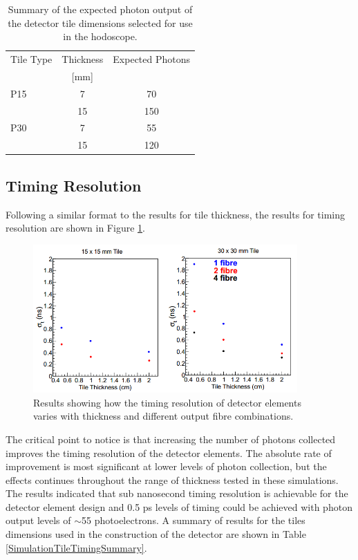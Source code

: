 \begin{table}\centering
	\renewcommand{\arraystretch}{1.3}
	\begin{tabular}{ @{}l  c  c@{}} 
		\toprule
		Tile Type & Thickness & Expected Photons \\
		& {\small [mm]}& \\
		\midrule
		P15 & 7 & 70 \\
		& 15 & 150 \\
		\midrule
		P30 & 7 & 55  \\
		& 15 & 120 \\
		\bottomrule
	\end{tabular}
	\caption{Summary of the expected photon output of the detector tile dimensions selected for use in the hodoscope.}
	\label{SimulationTileThickSummary}
\end{table}

\subsection{Timing Resolution}

Following a similar format to the results for tile thickness, the results for timing resolution are shown in Figure \ref{SimulationTiming}.

\begin{figure}
	\centering
	\includegraphics[width=0.9\textwidth]{ImgChap1/timingsim}
	\caption{Results showing how the timing resolution of detector elements varies with thickness and different output fibre combinations. \cite{FTTDR2012}}
	\label{SimulationTiming}
\end{figure}

The critical point to notice is that increasing the number of photons collected improves the timing resolution of the detector elements. The absolute rate of improvement is most significant at lower levels of photon collection, but the effects continues throughout the range of thickness tested in these simulations. The results indicated that sub nanosecond timing resolution is achievable for the detector element design and 0.5 ps levels of timing could be achieved with photon output levels of $\sim$55 photoelectrons. A summary of results for the tiles dimensions used in the construction of the detector are shown in Table \ref{SimulationTileTimingSummary}.

